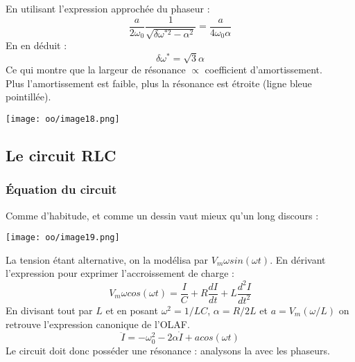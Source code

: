 \documentclass[british,french,11pt, a4paper, openany]{book}
\begin{document}
	En utilisant l'expression approchée du phaseur :
	\begin{equation}
		\frac{a}{2\omega_0}\frac{1}{\sqrt{\delta\omega^{*2} - \alpha^2}} = \frac{a}{4\omega_0\alpha}
	\end{equation}
	En en déduit :
	\begin{equation}
		\delta\omega^* = \sqrt{3}\alpha
	\end{equation}
	Ce qui montre que la largeur de résonance $\propto$ coefficient d'amortissement.\\
	Plus l'amortissement est faible, plus la résonance est étroite (ligne bleue pointillée).
	\begin{center}
		\texttt{[image: oo/image18.png]}
	\end{center}
	\subsection{Le circuit RLC}
	\subsubsection{Équation du circuit}
	Comme d'habitude, et comme un dessin vaut mieux qu'un long discours :
	\begin{center}
		\texttt{[image: oo/image19.png]}
	\end{center}
	
	La tension étant alternative, on la modélisa par $V_m\omega sin(\omega t)$. En dérivant l'expression pour exprimer l'accroissement de charge : 
	\begin{equation}
		V_m\omega cos(\omega t) = \frac{I}{C} + R\frac{dI}{dt} + L\frac{d^2I}{dt^2}
	\end{equation}
	En divisant tout par $L$ et en posant $\omega^2 = 1/LC$, $\alpha = R/2L$ et $a = V_m(\omega/L)$ on retrouve l'expression canonique de l'OLAF.
	\begin{equation}
		\ddot{I} = -\omega_0^2 - 2\alpha\dot{I} + a cos(\omega t)
	\end{equation}
	Le circuit doit donc posséder une résonance : analysons la avec les phaseurs.
	
\end{document}
